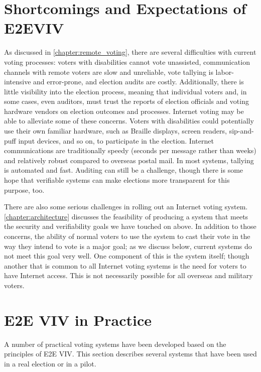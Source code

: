 \section{Shortcomings and Expectations of E2EVIV}
As discussed in \autoref{chapter:remote_voting}, there are several
difficulties with current voting processes: voters with disabilities cannot
vote unassisted, communication channels with remote voters are slow and
unreliable, vote tallying is labor-intensive and error-prone, and
election audits are costly. Additionally, there is little visibility into
the election process, meaning that individual voters and, in some cases,
even auditors, must trust the reports of election officials and voting
hardware vendors on election outcomes and processes. Internet voting may be
able to alleviate some of these concerns. Voters with disabilities could
potentially use their own familiar hardware, such as Braille displays,
screen readers, sip-and-puff input devices, and so on, to participate in the
election. Internet communications are traditionally speedy (seconds per
message rather than weeks) and relatively robust compared to overseas postal
mail. In most systems, tallying is automated and fast. Auditing can still be
a challenge, though there is some hope that verifiable systems can make
elections more transparent for this purpose, too.

There are also some serious challenges in rolling out an Internet voting
system. \autoref{chapter:architecture} discusses the feasibility of
producing a system that meets the security and verifiability goals we have
touched on above. In addition to those concerns, the ability of normal
voters to use the system to cast their vote in the way they intend to vote
is a major goal; as we discuss below, current systems do not meet this goal
very well. One component of this is the system itself; though another that
is common to all Internet voting systems is the need for voters to have
Internet access. This is not necessarily possible for all overseas and
military voters.

\section{E2E VIV in Practice}

A number of practical voting systems have been developed based on the
principles of E2E VIV. This section describes several systems that
have been used in a real election or in a pilot.

